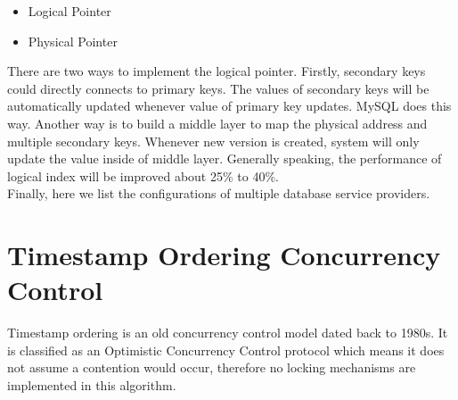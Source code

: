 \begin{itemize}
	\item Logical Pointer
	\item Physical Pointer
\end{itemize}
There are two ways to implement the logical pointer. Firstly, secondary keys could directly connects to primary keys. The values of secondary keys will be automatically updated whenever value of primary key updates. MySQL does this way. Another way is to build a middle layer to map the physical address and multiple secondary keys. Whenever new version is created, system will only update the value inside of middle layer. Generally speaking, the performance of logical index will be improved about 25\% to 40\%.\\

Finally, here we list the configurations of multiple database service providers.
\begin{table}[H]
		
\end{table}
\section{Timestamp Ordering Concurrency Control}

Timestamp ordering is an old concurrency control model dated back to 1980s\cite{li1987performance}. It is classified as an Optimistic Concurrency Control protocol which means it does not assume a contention would occur, therefore no locking mechanisms are implemented in this algorithm.

